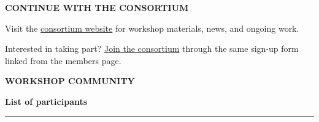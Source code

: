 \documentclass[9pt,a5paper,twoside]{extarticle}
\newcommand{\eyebrow}[1]{%
  {\small\bfseries\color{Sky}\MakeUppercase{#1}}\par\vspace{2mm}}
\begin{document}
\vspace{4mm}
\begin{infobox}
  {\bfseries\color{DeepBlue}CONTINUE WITH THE CONSORTIUM}\par\vspace{2mm}
  Visit the \href{https://accelerating-astrophysical-discovery.github.io/}{consortium website} for workshop materials, news, and ongoing work.

  Interested in taking part? \href{https://docs.google.com/forms/d/e/1FAIpQLSf9cepUblJ_UEt2-9TlchmWkx-JINSjlTbjsOd1VkEH4i9W2Q/viewform}{Join the consortium} through the same sign-up form linked from the members page.
\end{infobox}

\newpage

\eyebrow{Workshop community}
{\fontsize{18}{20}\selectfont\bfseries\color{Night}List of participants\par}
\vspace{1.5mm}
{\color{Gold}\rule{18mm}{1.4pt}}\par\vspace{2mm}
\end{document}
